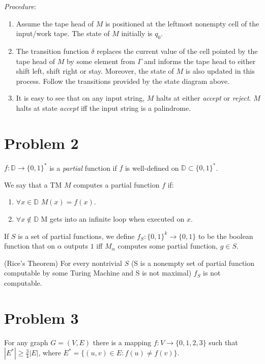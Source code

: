 \documentclass[twoside]{article}
\newcommand{\DD}{\mathbb{D}}
\begin{document}
\textit{Procedure}:
\begin{enumerate}
	\item Assume the tape head of $M$ is positioned at the leftmost nonempty cell of the input/work tape. The state of
	$M$ initially is $q_0$.

	\item The transition function $\delta$ replaces the current
	value of the cell pointed by the tape head of $M$ by some
	element from $\Gamma$ and informs the tape head to either shift left, shift right or stay. Moreover, the state of $M$
	is also updated in this process. Follow the transitions provided by the state diagram above. 

	\item It is easy to see that on any input string, $M$ halts
	at either \textit{accept} or \textit{reject}. $M$ halts at
	state \textit{accept} iff the input string is a palindrome.
\end{enumerate}

\newpage
\section*{Problem 2}
	$f : \DD \rightarrow \{ 0, 1 \}^*$ is a \textit{partial} function if $f$ is well-defined on $\DD \subset \{ 0, 1 \}^*$.

\par
We say that a TM $M$ computes a partial function $f$ if:
\begin{enumerate}
\item	$\forall x \in \DD$ $M(x) = f(x)$.
\item	$\forall x \notin \DD$ M gets into an infinite loop when executed on $x$.
\end{enumerate}

If $S$ is a set of partial functions, we define $f_S : \{ 0, 1 \}^k \rightarrow \{ 0, 1 \}$ to be the boolean function that on $\alpha$ outputs $1$ iff $M_{\alpha}$ computes some partial function, $g \in S$.

\theorem(Rice's Theorem) For every nontrivial $S$ (S is a nonempty set of partial function computable by some Turing Machine and S is not maximal) $f_S$ is not computable.

\newpage
\section*{Problem 3}
\par
\theorem For any graph $G = (V, E)$ there is a mapping $f : V 
\rightarrow \{ 0, 1, 2, 3 \}$ such that $|E^*| \ge 
\frac{3}{4}|E|$, where $E^* = \{ (u, v) \in E : f(u) \ne f(v) 
\}$.
 
\end{document}
